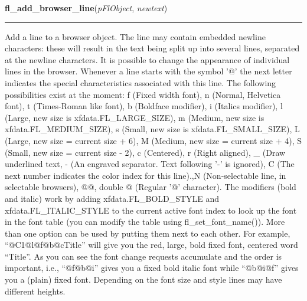     \label{xformslib:flbrowser:fl_add_browser_line}

    \vspace{0.5ex}

\hspace{.8\funcindent}\begin{boxedminipage}{\funcwidth}

    \raggedright \textbf{fl\_add\_browser\_line}(\textit{pFlObject}, \textit{newtext})

    \vspace{-1.5ex}

    \rule{\textwidth}{0.5\fboxrule}
\setlength{\parskip}{2ex}

Add a line to a browser object. The line may contain embedded newline
characters: these will result in the text being split up into several
lines, separated at the newline characters. It is possible to change the
appearance of individual lines in the browser. Whenever a line starts
with the symbol '@' the next letter indicates the special characteristics
associated with this line. The following possibilities exist at the moment:
f (Fixed width font), n (Normal, Helvetica font), t (Times-Roman like
font), b (Boldface modifier), i (Italics modifier), l (Large, new size is
xfdata.FL\_LARGE\_SIZE), m (Medium, new size is xfdata.FL\_MEDIUM\_SIZE),
s (Small, new size is xfdata.FL\_SMALL\_SIZE), L (Large, new size = current
size + 6), M (Medium, new size = current size + 4), S (Small, new size =
current size - 2), c (Centered), r (Right aligned), \_ (Draw underlined
text, - (An engraved separator. Text following '-' is ignored), C (The
next number indicates the color index for this line).,N (Non-selectable
line, in selectable browsers), @@, double @ (Regular '@' character). The
modifiers (bold and italic) work by adding xfdata.FL\_BOLD\_STYLE and
xfdata.FL\_ITALIC\_STYLE to the current active font index to look up the
font in the font table (you can modify the table using fl\_set\_font\_name()).
More than one option can be used by putting them next to each other. For
example, ``@C1@l@f@b@cTitle'' will give you the red, large, bold fixed font,
centered word ``Title''. As you can see the font change requests accumulate
and the order is important, i.e., ``@f@b@i'' gives you a fixed bold italic
font while ``@b@i@f'' gives you a (plain) fixed font. Depending on the font
size and style lines may have different heights.


\end{boxedminipage}

